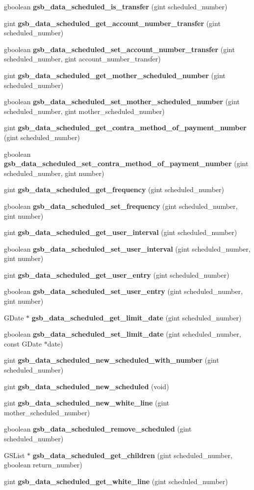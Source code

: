 \begin{DoxyCompactItemize}
\item 
gboolean {\bf gsb\_\-data\_\-scheduled\_\-is\_\-transfer} (gint scheduled\_\-number)
\item 
gint {\bf gsb\_\-data\_\-scheduled\_\-get\_\-account\_\-number\_\-transfer} (gint scheduled\_\-number)
\item 
gboolean {\bf gsb\_\-data\_\-scheduled\_\-set\_\-account\_\-number\_\-transfer} (gint scheduled\_\-number, gint account\_\-number\_\-transfer)
\item 
gint {\bf gsb\_\-data\_\-scheduled\_\-get\_\-mother\_\-scheduled\_\-number} (gint scheduled\_\-number)
\item 
gboolean {\bf gsb\_\-data\_\-scheduled\_\-set\_\-mother\_\-scheduled\_\-number} (gint scheduled\_\-number, gint mother\_\-scheduled\_\-number)
\item 
gint {\bf gsb\_\-data\_\-scheduled\_\-get\_\-contra\_\-method\_\-of\_\-payment\_\-number} (gint scheduled\_\-number)
\item 
gboolean {\bf gsb\_\-data\_\-scheduled\_\-set\_\-contra\_\-method\_\-of\_\-payment\_\-number} (gint scheduled\_\-number, gint number)
\item 
gint {\bf gsb\_\-data\_\-scheduled\_\-get\_\-frequency} (gint scheduled\_\-number)
\item 
gboolean {\bf gsb\_\-data\_\-scheduled\_\-set\_\-frequency} (gint scheduled\_\-number, gint number)
\item 
gint {\bf gsb\_\-data\_\-scheduled\_\-get\_\-user\_\-interval} (gint scheduled\_\-number)
\item 
gboolean {\bf gsb\_\-data\_\-scheduled\_\-set\_\-user\_\-interval} (gint scheduled\_\-number, gint number)
\item 
gint {\bf gsb\_\-data\_\-scheduled\_\-get\_\-user\_\-entry} (gint scheduled\_\-number)
\item 
gboolean {\bf gsb\_\-data\_\-scheduled\_\-set\_\-user\_\-entry} (gint scheduled\_\-number, gint number)
\item 
GDate $\ast$ {\bf gsb\_\-data\_\-scheduled\_\-get\_\-limit\_\-date} (gint scheduled\_\-number)
\item 
gboolean {\bf gsb\_\-data\_\-scheduled\_\-set\_\-limit\_\-date} (gint scheduled\_\-number, const GDate $\ast$date)
\item 
gint {\bf gsb\_\-data\_\-scheduled\_\-new\_\-scheduled\_\-with\_\-number} (gint scheduled\_\-number)
\item 
gint {\bf gsb\_\-data\_\-scheduled\_\-new\_\-scheduled} (void)
\item 
gint {\bf gsb\_\-data\_\-scheduled\_\-new\_\-white\_\-line} (gint mother\_\-scheduled\_\-number)
\item 
gboolean {\bf gsb\_\-data\_\-scheduled\_\-remove\_\-scheduled} (gint scheduled\_\-number)
\item 
GSList $\ast$ {\bf gsb\_\-data\_\-scheduled\_\-get\_\-children} (gint scheduled\_\-number, gboolean return\_\-number)
\item 
gint {\bf gsb\_\-data\_\-scheduled\_\-get\_\-white\_\-line} (gint scheduled\_\-number)
\end{DoxyCompactItemize}
